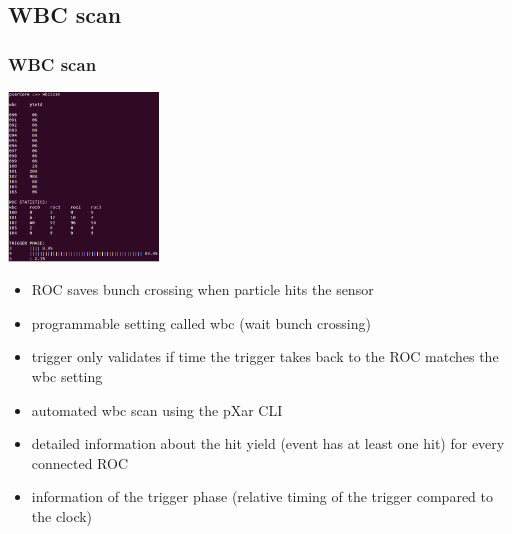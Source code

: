 \documentclass[9pt]{beamer}
\begin{document}
\subsection{WBC scan}
\begin{frame}
	\frametitle{WBC scan}
	\begin{center}
		\begin{minipage}{4.0cm}
			\centering
			\includegraphics[width=4.0cm]{Pics/wbcscan1}
		\end{minipage}
		\hspace*{2pt}
		\begin{minipage}{7cm}
			\begin{itemize}
				\item ROC saves bunch crossing when particle hits the sensor
				\item programmable setting called wbc (wait bunch crossing)
				\item trigger only validates if time the trigger takes back to the ROC matches the wbc setting
				\item automated wbc scan using the pXar CLI
				\item detailed information about the hit yield (event has at least one hit) for every connected ROC
				\item information of the trigger phase (relative timing of the trigger compared to the clock)
			\end{itemize}
		\end{minipage}\no\s
	\end{center}
\end{frame}
\end{document}
